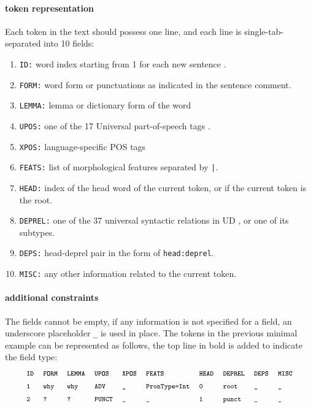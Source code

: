 \paragraph{token representation} 
Each token in the text should possess one line, and each line is single-tab-separated into 10 fields:
\begin{enumerate}
	\item \texttt{ID:} word index starting from 1 for each new sentence .
	\item \texttt{FORM:} word form or punctuations as indicated in the sentence comment.
	\item \texttt{LEMMA:} lemma or dictionary form of the word
	\item \texttt{UPOS:} one of the 17 Universal part-of-speech tags .
	\item \texttt{XPOS:} language-specific POS tags
	\item \texttt{FEATS:} list of morphological features  separated by \texttt{|}.
	\item \texttt{HEAD:} index of the head word of the current token, or  if the current token is the root.
	\item \texttt{DEPREL:} one of the 37 universal syntactic relations in UD , or one of its subtypes.
	\item \texttt{DEPS:} head-deprel pair in the form of \texttt{head:deprel}.
	\item \texttt{MISC:} any other information related to the current token.
\end{enumerate}
\paragraph{additional constraints} The fields cannot be empty, if any information  is not specified for a field, an underscore placeholder \texttt{\_} is used in place.
The tokens in the previous minimal example can be represented as follows, the top line in bold is added to indicate the field type:
\begin{align*}
&\footnotesize\texttt{\textbf{ID}}&\hspace{0.1em}&\footnotesize\texttt{\textbf{FORM}}&\hspace{0.1em}&\footnotesize\texttt{\textbf{LEMMA}}&\hspace{0.1em}&\footnotesize\texttt{\textbf{UPOS}}&\hspace{0.1em}&\footnotesize\texttt{\textbf{XPOS}}&\hspace{0.1em}&\footnotesize\texttt{\textbf{FEATS}}&\hspace{0.1em}&\footnotesize\texttt{\textbf{HEAD}}&\hspace{0.1em}&\footnotesize\texttt{\textbf{DEPREL}}&\hspace{0.1em}&\footnotesize\texttt{\textbf{DEPS}}&\hspace{0.1em}&\footnotesize\texttt{\textbf{MISC}}\\
&\footnotesize\texttt{1}&\hspace{0.1em}&\footnotesize\texttt{why}&\hspace{0.1em}&\footnotesize\texttt{why}&\hspace{0.1em}&\footnotesize\texttt{ADV}&\hspace{0.1em}&\footnotesize\texttt{\_}&\hspace{0.1em}&\footnotesize\texttt{PronType=Int}&\hspace{0.1em}&\footnotesize\texttt{0}&\hspace{0.1em}&\footnotesize\texttt{root}&\hspace{0.1em}&\footnotesize\texttt{\_}&\hspace{0.1em}&\footnotesize\texttt{\_}\\
&\footnotesize\texttt{2}&\hspace{0.1em}&\footnotesize\texttt{?}&\hspace{0.1em}&\footnotesize\texttt{?}&\hspace{0.1em}&\footnotesize\texttt{PUNCT}&\hspace{0.1em}&\footnotesize\texttt{\_}&\hspace{0.1em}&\footnotesize\texttt{\_}&\hspace{0.1em}&\footnotesize\texttt{1}&\hspace{0.1em}&\footnotesize\texttt{punct}&\hspace{0.1em}&\footnotesize\texttt{\_}&\hspace{0.1em}&\footnotesize\texttt{\_}
\end{align*}

